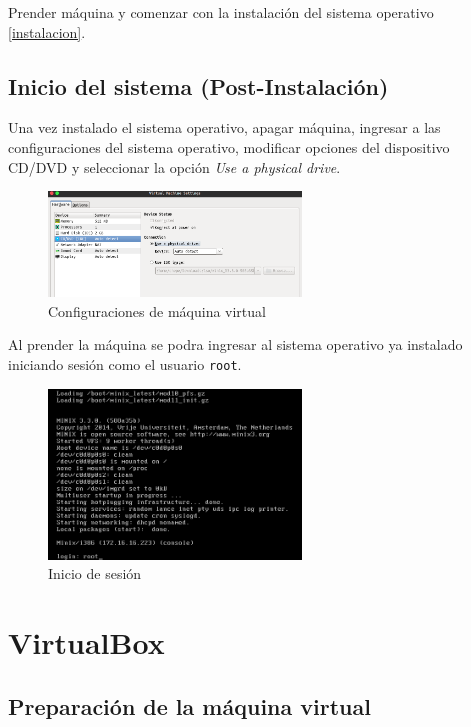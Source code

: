 \documentclass[12pt]{scrartcl}
\begin{document}
Prender máquina y comenzar con la instalación del sistema operativo \ref{instalacion}.\\

\subsection{Inicio del sistema (Post-Instalación)}\label{vm:post}
Una vez instalado el sistema operativo, apagar máquina, ingresar a las configuraciones del sistema operativo, modificar opciones del dispositivo CD/DVD y seleccionar la opción \textit{Use a physical drive}.

\begin{figure}[H]
  \centering
  \includegraphics[width=0.6\textwidth]{vm/min32.png}
  \caption{Configuraciones de máquina virtual}
\end{figure}

Al prender la máquina se podra ingresar al sistema operativo ya instalado iniciando sesión como el usuario \texttt{root}.
\begin{figure}[H]
  \centering
  \includegraphics[width=0.6\textwidth]{vm/min33.png}
  \caption{Inicio de sesión}
\end{figure}

\newpage
\section{VirtualBox}

\subsection{Preparación de la máquina virtual}
\end{document}
